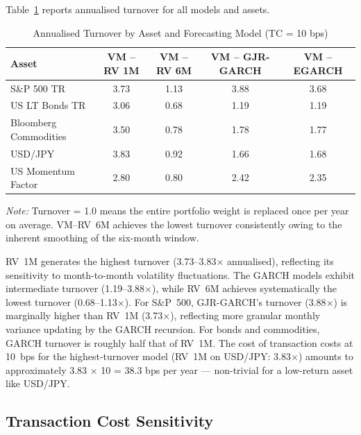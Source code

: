 \documentclass[12pt, a4paper]{article}
\begin{document}
Table~\ref{tab:turnover} reports annualised turnover for all models and assets.

\begin{table}[H]
  \centering
  \caption{Annualised Turnover by Asset and Forecasting Model (TC = 10 bps)}
  \label{tab:turnover}
  \small
  \begin{tabular}{lcccc}
    \toprule
    \textbf{Asset} & \textbf{VM -- RV 1M} & \textbf{VM -- RV 6M}
                   & \textbf{VM -- GJR-GARCH} & \textbf{VM -- EGARCH} \\
    \midrule
    S\&P 500 TR            & 3.73 & 1.13 & 3.88 & 3.68 \\
    US LT Bonds TR         & 3.06 & 0.68 & 1.19 & 1.19 \\
    Bloomberg Commodities  & 3.50 & 0.78 & 1.78 & 1.77 \\
    USD/JPY                & 3.83 & 0.92 & 1.66 & 1.68 \\
    US Momentum Factor     & 2.80 & 0.80 & 2.42 & 2.35 \\
    \bottomrule
  \end{tabular}
  \begin{minipage}{\textwidth}
    \vspace{2pt}
    \footnotesize\textit{Note:} Turnover = 1.0 means the entire portfolio weight is replaced once per year on average.
    VM--RV~6M achieves the lowest turnover consistently owing to the inherent smoothing of the six-month window.
  \end{minipage}
\end{table}

RV~1M generates the highest turnover (3.73--3.83$\times$ annualised), reflecting its
sensitivity to month-to-month volatility fluctuations. The GARCH models exhibit
intermediate turnover (1.19--3.88$\times$), while RV~6M achieves systematically the
lowest turnover (0.68--1.13$\times$). For S\&P~500, GJR-GARCH's turnover (3.88$\times$)
is marginally higher than RV~1M (3.73$\times$), reflecting more granular monthly variance
updating by the GARCH recursion. For bonds and commodities, GARCH turnover is roughly
half that of RV~1M. The cost of transaction costs at 10~bps for the highest-turnover
model (RV~1M on USD/JPY: 3.83$\times$) amounts to approximately 3.83 $\times$ 10 = 38.3
bps per year --- non-trivial for a low-return asset like USD/JPY.

\subsection{Transaction Cost Sensitivity}
\end{document}

